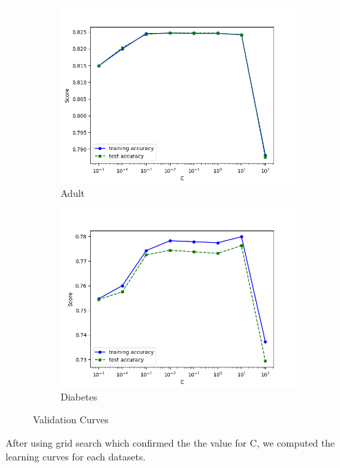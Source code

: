 \documentclass[11pt, twocolumn]{article}
\begin{document}
    \begin{figure}[!htbp]
        \begin{subfigure}{.24\textwidth}
            \centering
            \includegraphics[width=.9\textwidth]{validations_Adult_SVC_Linear_C}
            \caption{Adult}
            \label{fig:validations_Adult_SVC_Linear_C}
        \end{subfigure}
        \begin{subfigure}{.24\textwidth}
            \centering
            \includegraphics[width=.9\textwidth]{validations_Diabetes_SVC_Linear_C}
            \caption{Diabetes}
            \label{fig:validations_Diabetes_SVC_Linear_C}
        \end{subfigure}
        \caption{Validation Curves}
    \end{figure}
    \FloatBarrier

    After using grid search which confirmed the the value for C, we computed the learning curves for each datasets.
\end{document}
